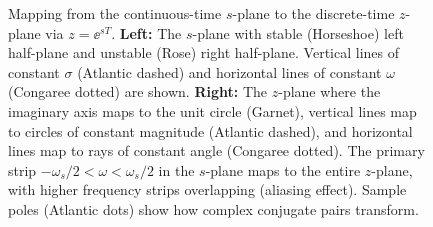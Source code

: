 \begin{figure}[htbp]
\caption{Mapping from the continuous-time $s$-plane to the discrete-time $z$-plane via $z = \ee^{sT}$. \textbf{Left:} The $s$-plane with stable (Horseshoe) left half-plane and unstable (Rose) right half-plane. Vertical lines of constant $\sigma$ (Atlantic dashed) and horizontal lines of constant $\omega$ (Congaree dotted) are shown. \textbf{Right:} The $z$-plane where the imaginary axis maps to the unit circle (Garnet), vertical lines map to circles of constant magnitude (Atlantic dashed), and horizontal lines map to rays of constant angle (Congaree dotted). The primary strip $-\omega_s/2 < \omega < \omega_s/2$ in the $s$-plane maps to the entire $z$-plane, with higher frequency strips overlapping (aliasing effect). Sample poles (Atlantic dots) show how complex conjugate pairs transform.}
\label{fig:s_to_z_mapping}
\end{figure}
